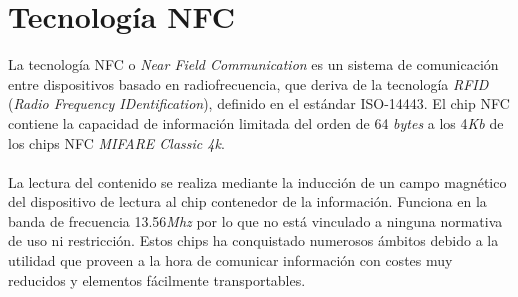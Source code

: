 \documentclass[../PFC.tex]{subfiles}
\begin{document}
\section{Tecnología NFC}
\label{Tecnología NFC}

La tecnología NFC o \textit{Near Field Communication} es un sistema de comunicación entre dispositivos basado en radiofrecuencia, que deriva de la tecnología \textit{RFID} (\textit{Radio Frequency IDentification}), definido en el estándar ISO-14443\cite{iso14443}. El chip NFC contiene la capacidad de información limitada del orden de 64 \textit{bytes} a los 4\textit{Kb} de los chips NFC \textit{MIFARE Classic 4k}.
\\\\
La lectura del contenido se realiza mediante la inducción de un campo magnético del dispositivo de lectura al chip contenedor de la información. Funciona en la banda de frecuencia 13.56\textit{Mhz} por lo que no está vinculado a ninguna normativa de uso ni restricción. Estos chips ha conquistado numerosos ámbitos debido a la utilidad que proveen a la hora de comunicar información con costes muy reducidos y elementos fácilmente transportables.
\end{document}
